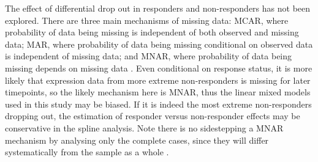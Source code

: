 The effect of differential drop out in responders and non-responders has not been explored.
There are three main mechanisms of missing data:
\gls{MCAR}, where probability of data being missing is independent of both observed and missing data;
\gls{MAR}, where probability of data being missing conditional on observed data is independent of missing data;
and \gls{MNAR}, where probability of data being missing depends on missing data \autocite{liu2016MethodsHandlingMissing}.
Even conditional on response status, it is more likely that expression data from more extreme non-responders is missing for later timepoints, so the likely mechanism here is \gls{MNAR},
thus the linear mixed models used in this study may be biased.
If it is indeed the most extreme non-responders dropping out, the estimation of responder versus non-responder effects may be conservative in the spline analysis.
Note there is no sidestepping a \gls{MNAR} mechanism by analysing only the complete cases, 
since they will differ systematically from the sample as a whole \autocite{ibrahim2009MissingDataMethods}.

